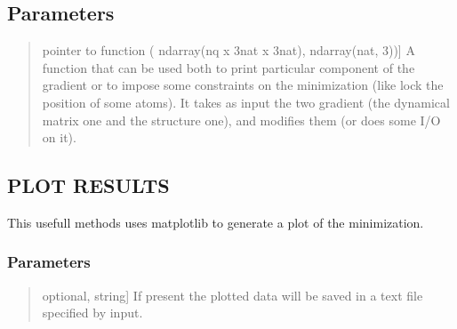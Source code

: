 \documentclass[a4paper,11pt,english]{sphinxmanual}
\begin{document}
\begin{fulllineitems}
\begin{fulllineitems}
\subsection{Parameters}
\label{\detokenize{apireference:id35}}\begin{quote}
\begin{description}
\sphinxlineitem{custom\_function\_gradient}{[}pointer to function ( ndarray(nq x 3nat x 3nat), ndarray(nat, 3)){]}
\sphinxAtStartPar
A function that can be used both to print particular component of the gradient
or to impose some constraints on the minimization (like lock the position of some atoms).
It takes as input the two gradient (the dynamical matrix one and the structure one), and
modifies them (or does some I/O on it).

\end{description}
\end{quote}

\end{fulllineitems}


\begin{fulllineitems}
\label{\detokenize{apireference:sscha.SchaMinimizer.SSCHA_Minimizer.plot_results}}
\pysigstartsignatures
{}
\pysigstopsignatures

\subsection{PLOT RESULTS}
\label{\detokenize{apireference:plot-results}}
\sphinxAtStartPar
This usefull methods uses matplotlib to generate a plot of the
minimization.


\subsubsection{Parameters}
\label{\detokenize{apireference:id36}}\begin{quote}
\begin{description}
\sphinxlineitem{save\_filename}{[}optional, string{]}
\sphinxAtStartPar
If present the plotted data will be saved in
a text file specified by input.


\end{description}
\end{quote}
\end{fulllineitems}
\end{fulllineitems}
\end{document}
